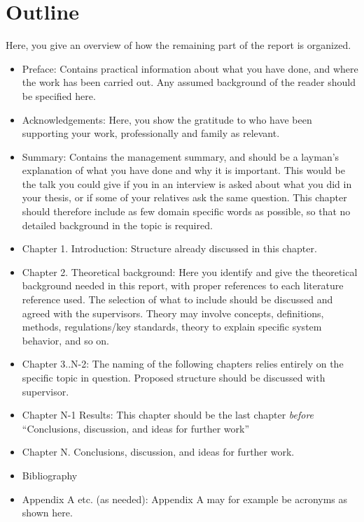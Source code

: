 \section{Outline}
\label{sec:outline}
\begin{info}
	Here, you give an overview of how the remaining part of the report is organized.
\end{info}

\begin{itemize}
	\item Preface: Contains practical information about what you have done, and where the work has been carried out. Any assumed background of the reader should be specified here.
	\item Acknowledgements: Here, you show the gratitude to who have been supporting your work, professionally and family as relevant.
	\item Summary: Contains the management summary, and should be a layman's explanation of what you have done and why it is important. This would be the talk you could give if you in an  interview is asked about what you did in your thesis, or if some of your relatives ask the same question. This chapter should therefore include as few domain specific words as possible, so that no detailed background in the topic is required.
	\item Chapter 1. Introduction: Structure already discussed in this chapter.
	\item Chapter 2. Theoretical background: Here you identify and give the theoretical background needed in this report, with proper references to each literature reference used. The selection of what to include should be discussed and agreed with the supervisors. Theory may involve concepts, definitions, methods, regulations/key standards, theory to explain specific system behavior, and so on.
	\item Chapter 3..N-2: The naming of the following chapters relies entirely on the specific topic in question. Proposed structure should be discussed with supervisor.
	\item Chapter N-1 Results: This chapter should be the last chapter \textit{before} ``Conclusions, discussion, and ideas for further work''
	\item Chapter N. Conclusions, discussion, and ideas for further work.
	\item Bibliography
	\item Appendix A etc. (as needed): Appendix A may for example be acronyms as shown here.
\end{itemize}

